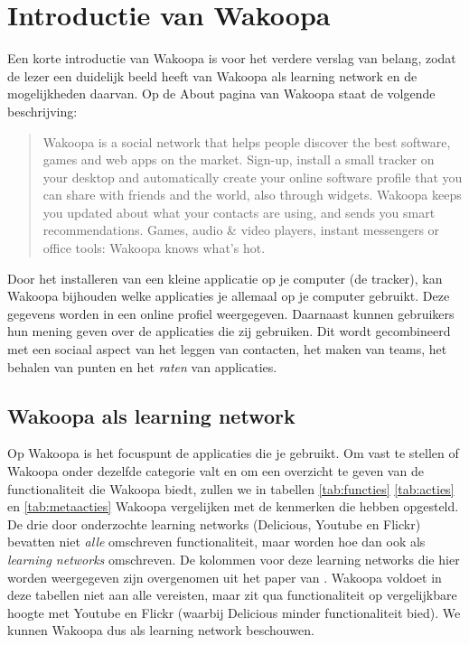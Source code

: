 \documentclass[a4paper, 10pt, pdftex]{report}
\begin{document}
    \section{Introductie van Wakoopa}
      Een korte introductie van Wakoopa is voor het verdere verslag van belang, zodat de lezer een duidelijk beeld heeft van Wakoopa als learning network en de mogelijkheden daarvan. Op de About pagina van Wakoopa \citep{Gaal2007} staat de volgende beschrijving:
        \begin{quote} Wakoopa is a social network that helps people discover the best software, games and web apps on the market. Sign-up, install a small tracker on your desktop and automatically create your online software profile that you can share with friends and the world, also through widgets. Wakoopa keeps you updated about what your contacts are using, and sends you smart recommendations. Games, audio \& video players, instant messengers or office tools: Wakoopa knows what's hot.
        \end{quote}
      Door het installeren van een kleine applicatie op je computer (de tracker), kan Wakoopa bijhouden welke applicaties je allemaal op je computer gebruikt. Deze gegevens worden in een online profiel weergegeven. Daarnaast kunnen gebruikers hun mening geven over de applicaties die zij gebruiken. Dit wordt gecombineerd met een sociaal aspect van het leggen van contacten, het maken van teams, het behalen van punten en het \emph{raten} van applicaties.

        \subsection{Wakoopa als learning network}
        Op Wakoopa is het focuspunt de applicaties die je gebruikt. Om vast te stellen of Wakoopa onder dezelfde categorie valt en om een overzicht te geven van de functionaliteit die Wakoopa biedt, zullen we in tabellen \ref{tab:functies} \ref{tab:acties} en \ref{tab:metaacties} \label{learningnetwork} Wakoopa vergelijken met de kenmerken die \citeauthor{Berlanga2007} hebben opgesteld.
         De drie door \citeauthor{Berlanga2007}  onderzochte learning networks (Delicious, Youtube en Flickr) bevatten niet \emph{alle} omschreven functionaliteit, maar worden hoe dan ook als \emph{learning networks} omschreven. De kolommen voor deze learning networks die hier worden weergegeven zijn overgenomen uit het paper van \citeauthor{Berlanga2007}. Wakoopa voldoet in deze tabellen niet aan alle vereisten, maar zit qua functionaliteit op vergelijkbare hoogte met Youtube en Flickr (waarbij Delicious minder functionaliteit bied). We kunnen Wakoopa dus als learning network beschouwen.
\end{document}
